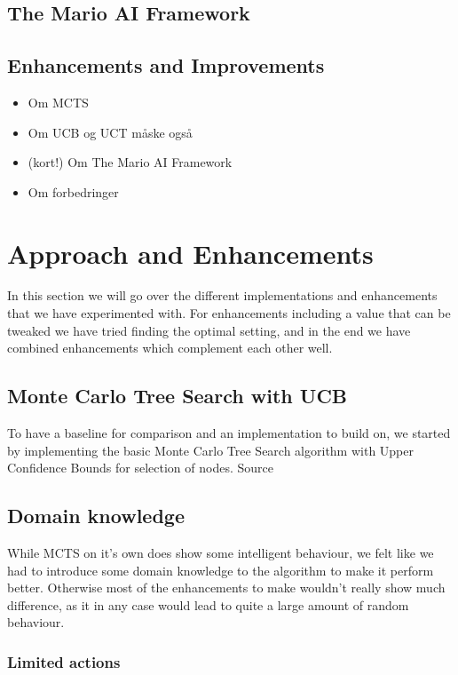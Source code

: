 \documentclass[10pt,a4paper]{article}
\begin{document}
\subsection{The Mario AI Framework}

\subsection{Enhancements and Improvements}

\begin{itemize}
\item Om MCTS \cite{mctssurvey}
\item Om UCB og UCT \cite{mctssurvey} måske også \cite{mspacman}
\item (kort!) Om The Mario AI Framework  \cite{mario}
\item Om forbedringer
\end{itemize}
\clearpage

\section{Approach and Enhancements}
In this section we will go over the different implementations and enhancements that we have experimented with. For enhancements including a value that can be tweaked we have tried finding the optimal setting, and in the end we have combined enhancements which complement each other well.

\subsection{Monte Carlo Tree Search with UCB}
To have a baseline for comparison and an implementation to build on, we started by implementing the basic Monte Carlo Tree Search algorithm with Upper Confidence Bounds for selection of nodes.
Source \cite{mctssurvey}
\subsection{Domain knowledge}
While MCTS on it's own does show some intelligent behaviour, we felt like we had to introduce some domain knowledge to the algorithm to make it perform better. Otherwise most of the enhancements to make wouldn't really show much difference, as it in any case would lead to quite a large amount of random behaviour.

\subsubsection{Limited actions}
\end{document}
